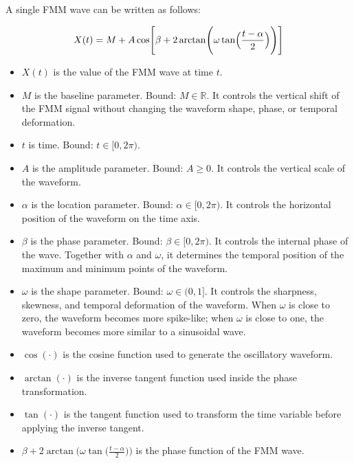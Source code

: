\documentclass{book}
\begin{document}
   A single FMM wave can be written as follows:

   \begin{equation}
      X(t)
      =
      M
      +
      A
      \cos
      \Biggl[
      \ensuremath{\beta}
      +
      2
      \arctan
      \Biggl(
      \ensuremath{\omega}
      \tan
      \Bigl(
      \frac{t-\ensuremath{\alpha}}{2}
      \Bigr)
      \Biggr)
      \Biggr]
   \end{equation}

   \begin{itemize}
      \item $X(t)$ is the value of the FMM wave at time $t$.

      \item $M$ is the baseline parameter. Bound: $M \in \mathbb{R}$.
      It controls the vertical shift of the FMM signal without changing
      the waveform shape, phase, or temporal deformation.

      \item $t$ is time. Bound: $t \in [0, 2\ensuremath{\pi})$.

      \item $A$ is the amplitude parameter. Bound: $A \geq 0$.
      It controls the vertical scale of the waveform.

      \item $\ensuremath{\alpha}$ is the location parameter. Bound:
      $\ensuremath{\alpha} \in [0, 2\ensuremath{\pi})$. It controls the horizontal position of
      the waveform on the time axis.

      \item $\ensuremath{\beta}$ is the phase parameter. Bound:
      $\ensuremath{\beta} \in [0, 2\ensuremath{\pi})$. It controls the internal phase of the wave.
      Together with $\ensuremath{\alpha}$ and $\ensuremath{\omega}$, it determines the temporal
      position of the maximum and minimum points of the waveform.

      \item $\ensuremath{\omega}$ is the shape parameter. Bound:
      $\ensuremath{\omega} \in (0, 1]$. It controls the sharpness, skewness, and
      temporal deformation of the waveform. When $\ensuremath{\omega}$ is close to
      zero, the waveform becomes more spike-like; when $\ensuremath{\omega}$ is close
      to one, the waveform becomes more similar to a sinusoidal wave.

      \item $\cos(\cdot)$ is the cosine function used to generate the
      oscillatory waveform.

      \item $\arctan(\cdot)$ is the inverse tangent function used inside
      the phase transformation.

      \item $\tan(\cdot)$ is the tangent function used to transform the
      time variable before applying the inverse tangent.

      \item $\ensuremath{\beta} + 2 \arctan\bigl(\ensuremath{\omega}
      \tan\bigl(\frac{t-\ensuremath{\alpha}}{2}\bigr)\bigr)$ is the phase function of
      the FMM wave.
   \end{itemize}
\end{document}
